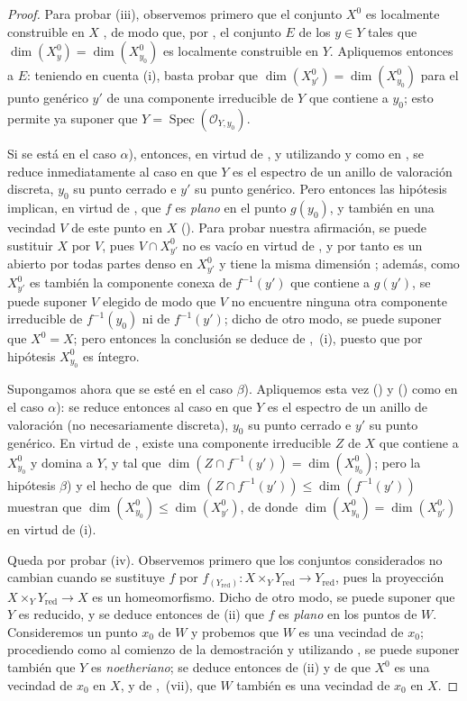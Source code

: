 \begin{proof}
Para probar (iii), observemos primero que el conjunto $X^0$ es localmente construible en $X$ , de modo que, por , el conjunto $E$ de los $y\in Y$ tales que $\dim(X_y^0)=\dim(X_{y_0}^0)$ es localmente construible en $Y$.
Apliquemos entonces  a $E$: teniendo en cuenta (i), basta probar que $\dim(X_{y'}^0)=\dim(X_{y_0}^0)$ para el punto genérico $y'$ de una componente irreducible de $Y$ que contiene a $y_0$; esto permite ya suponer que $Y=\operatorname{Spec}(\mathcal O_{Y,y_0})$.

Si se está en el caso $\alpha$), entonces, en virtud de , y utilizando  y  como en , se reduce inmediatamente al caso en que $Y$ es el espectro de un anillo de valoración discreta, $y_0$ su punto cerrado e $y'$ su punto genérico.
Pero entonces las hipótesis implican, en virtud de , que $f$ es \emph{plano} en el punto $g(y_0)$, y también en una vecindad $V$ de este punto en $X$ ().
Para probar nuestra afirmación, se puede sustituir $X$ por $V$, pues $V\cap X_{y'}^0$ no es vacío en virtud de , y por tanto es un abierto por todas partes denso en $X_{y'}^0$ y tiene la misma dimensión ; además, como $X_{y'}^0$ es también la componente conexa de $f^{-1}(y')$ que contiene a $g(y')$, se puede suponer $V$ elegido de modo que $V$ no encuentre ninguna otra componente irreducible de $f^{-1}(y_0)$ ni de $f^{-1}(y')$; dicho de otro modo, se puede suponer que $X^0=X$; pero entonces la conclusión se deduce de ,~(i), puesto que por hipótesis $X_{y_0}^0$ es íntegro.

Supongamos ahora que se esté en el caso $\beta$).
Apliquemos esta vez () y () como en el caso $\alpha$): se reduce entonces al caso en que $Y$ es el espectro de un anillo de valoración (no necesariamente discreta), $y_0$ su punto cerrado e $y'$ su punto genérico.
En virtud de , existe una componente irreducible $Z$ de $X$ que contiene a $X_{y_0}^0$ y domina a $Y$, y tal que $\dim(Z\cap f^{-1}(y'))=\dim(X_{y_0}^0)$; pero la hipótesis $\beta$) y el hecho de que $\dim(Z\cap f^{-1}(y'))\leqslant\dim(f^{-1}(y'))$ muestran que $\dim(X_{y_0}^0)\leqslant\dim(X_{y'}^0)$, de donde $\dim(X_{y_0}^0)=\dim(X_{y'}^0)$ en virtud de (i).

Queda por probar (iv).
Observemos primero que los conjuntos considerados no cambian cuando se sustituye $f$ por $f_{(Y_{\mathrm{red}})}:X\times_Y Y_{\mathrm{red}}\to Y_{\mathrm{red}}$, pues la proyección $X\times_Y Y_{\mathrm{red}}\to X$ es un homeomorfismo.
Dicho de otro modo, se puede suponer que $Y$ es reducido, y se deduce entonces de (ii) que $f$ es \emph{plano} en los puntos de $W$.
Consideremos un punto $x_0$ de $W$ y probemos que $W$ es una vecindad de $x_0$; procediendo como al comienzo de la demostración y utilizando , se puede suponer también que $Y$ es \emph{noetheriano}; se deduce entonces de (ii) y de  que $X^0$ es una vecindad de $x_0$ en $X$, y de ,~(vii), que $W$ también es una vecindad de $x_0$ en $X$.
\end{proof}


